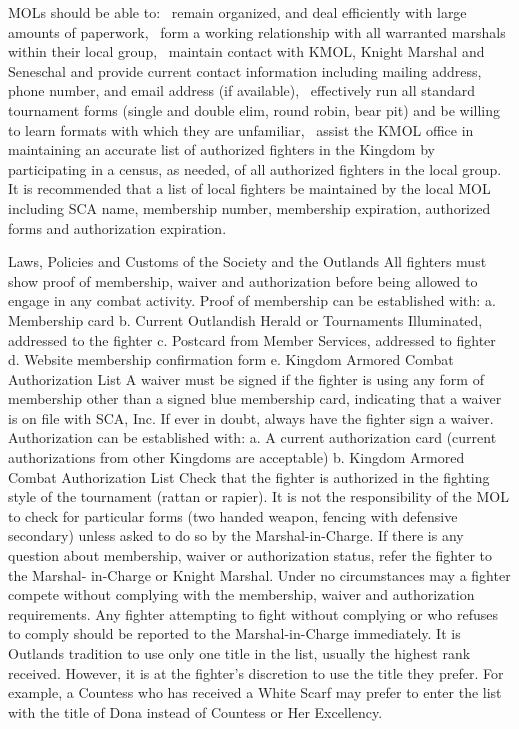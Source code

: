 \documentclass{article}
\begin{document}
MOLs should be able to:
~remain organized, and deal efficiently with large amounts of paperwork,
~form a working relationship with all warranted marshals within their local group,
~maintain contact with KMOL, Knight Marshal and Seneschal and provide current contact
information including mailing address, phone number, and email address (if available),
~effectively run all standard tournament forms (single and double elim, round robin, bear pit) and
be willing to learn formats with which they are unfamiliar,
~assist the KMOL office in maintaining an accurate list of authorized fighters in the Kingdom by
participating in a census, as needed, of all authorized fighters in the local group. It is
recommended that a list of local fighters be maintained by the local MOL including SCA name,
membership number, membership expiration, authorized forms and authorization expiration.

Laws, Policies and Customs of the Society and the Outlands
All fighters must show proof of membership, waiver and authorization before being allowed to engage in
any combat activity.
Proof of membership can be established with:
a. Membership card
b. Current Outlandish Herald or Tournaments Illuminated, addressed to the fighter
c. Postcard from Member Services, addressed to fighter
d. Website membership confirmation form
e. Kingdom Armored Combat Authorization List
A waiver must be signed if the fighter is using any form of membership other than a signed blue
membership card, indicating that a waiver is on file with SCA, Inc. If ever in doubt, always have the
fighter sign a waiver.
Authorization can be established with:
a. A current authorization card (current authorizations from other Kingdoms are acceptable)
b. Kingdom Armored Combat Authorization List
Check that the fighter is authorized in the fighting style of the tournament (rattan or rapier). It is not the
responsibility of the MOL to check for particular forms (two handed weapon, fencing with defensive
secondary) unless asked to do so by the Marshal-in-Charge.
If there is any question about membership, waiver or authorization status, refer the fighter to the Marshal-
in-Charge or Knight Marshal. Under no circumstances may a fighter compete without complying with the
membership, waiver and authorization requirements. Any fighter attempting to fight without complying
or who refuses to comply should be reported to the Marshal-in-Charge immediately.
It is Outlands tradition to use only one title in the list, usually the highest rank received. However, it is at
the fighter’s discretion to use the title they prefer. For example, a Countess who has received a White
Scarf may prefer to enter the list with the title of Dona instead of Countess or Her Excellency.
\end{document}
